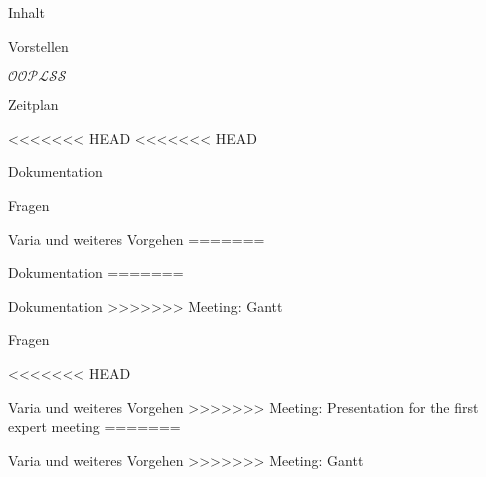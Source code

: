 
\begin{frame}
  \titlepage
\end{frame}

\begin{frame}[t]{Inhalt}
  \begin{bigitemize}[<+->]{3mm}
    \item<1-> Vorstellen

    \item<2-> $\mathcal{OOPLSS}$

    \item<3-> Zeitplan

<<<<<<< HEAD
<<<<<<< HEAD
    \item<4-> Dokumentation

    \item<5-> Fragen

    \item<6-> Varia und weiteres Vorgehen
=======
    \item<3-> Dokumentation
=======
    \item<4-> Dokumentation
>>>>>>> Meeting: Gantt

    \item<5-> Fragen

<<<<<<< HEAD
    \item<5-> Varia und weiteres Vorgehen
>>>>>>> Meeting: Presentation for the first expert meeting
=======
    \item<6-> Varia und weiteres Vorgehen
>>>>>>> Meeting: Gantt
  \end{bigitemize}
\end{frame}
